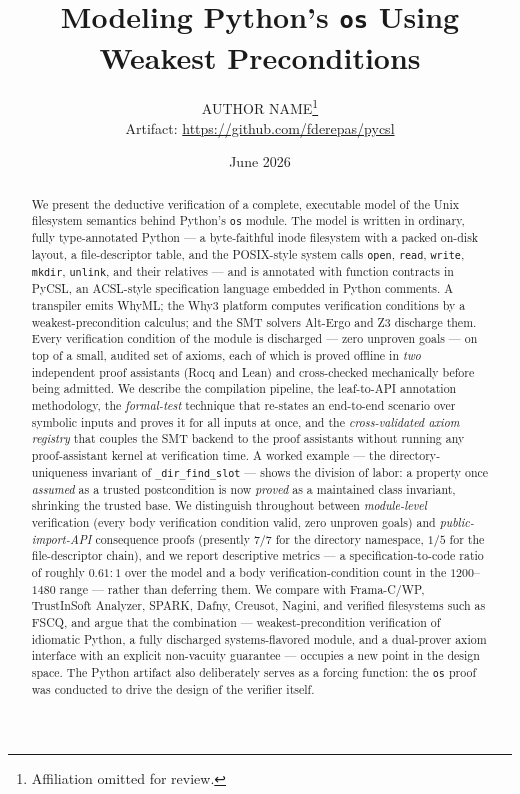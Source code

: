 \documentclass[11pt]{article}
\title{Modeling Python's \texttt{os} Using Weakest Preconditions}
\author{%
  AUTHOR NAME\thanks{Affiliation omitted for review.}\\
  \small Artifact: \url{https://github.com/fderepas/pycsl}}
\date{June 2026}
\newcommand{\pycsl}{\textsf{PyCSL}}
\newcommand{\whyml}{\textsf{WhyML}}
\newcommand{\why}{\textsf{Why3}}
\newcommand{\altergo}{\textsf{Alt-Ergo}}
\newcommand{\zthree}{\textsf{Z3}}
\newcommand{\rocq}{\textsf{Rocq}}
\newcommand{\lean}{\textsf{Lean}}
\newcommand{\osmod}{\texttt{os}}
\begin{document}
\maketitle

\begin{abstract}
We present the deductive verification of a complete, executable model of the
Unix filesystem semantics behind Python's \osmod{} module. The model is
written in ordinary, fully type-annotated Python --- a byte-faithful inode filesystem with a packed
on-disk layout, a file-descriptor table, and the POSIX-style system calls
\texttt{open}, \texttt{read}, \texttt{write}, \texttt{mkdir}, \texttt{unlink},
and their relatives --- and is annotated with function contracts in \pycsl{},
an ACSL-style specification language embedded in Python comments. A transpiler
emits \whyml{}; the \why{} platform computes verification conditions by a
weakest-precondition calculus; and the SMT solvers \altergo{} and \zthree{}
discharge them. Every verification condition of the module is discharged ---
zero unproven goals --- on top of a small, audited set of axioms, each of which
is proved offline in \emph{two} independent proof assistants (\rocq{} and
\lean{}) and cross-checked mechanically before being admitted. We describe the
compilation pipeline, the leaf-to-API annotation methodology, the
\emph{formal-test} technique that re-states an end-to-end scenario over
symbolic inputs and proves it for all inputs at once, and the
\emph{cross-validated axiom registry} that couples the SMT backend to the
proof assistants without running any proof-assistant kernel at verification
time. A worked example --- the directory-uniqueness invariant of
\texttt{\_dir\_find\_slot} --- shows the division of labor: a property once
\emph{assumed} as a trusted postcondition is now \emph{proved} as a maintained
class invariant, shrinking the trusted base. We distinguish throughout between
\emph{module-level} verification (every body verification condition valid, zero
unproven goals) and \emph{public-import-API} consequence proofs (presently
$7/7$ for the directory namespace, $1/5$ for the file-descriptor chain), and we
report descriptive metrics --- a specification-to-code ratio of roughly
$0.61{:}1$ over the model and a body verification-condition count in the
$1200$--$1480$ range --- rather than deferring them. We compare with
Frama-C/WP, TrustInSoft Analyzer, SPARK, Dafny, Creusot, Nagini, and verified
filesystems such as FSCQ, and argue that the combination --- weakest-precondition
verification of idiomatic Python, a fully discharged systems-flavored module,
and a dual-prover axiom interface with an explicit non-vacuity guarantee ---
occupies a new point in the design space. The Python artifact also deliberately serves as a
forcing function: the \osmod{} proof was conducted to drive the design of the
verifier itself.
\end{abstract}
\end{document}
